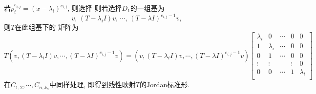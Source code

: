 若$p_i^{e_{i,j}} = (x-\lambda_i)^{e_{i,j}}$, 
则选择
则若选择$D_1$的一组基为
$$v,\, (T-\lambda_i I)v,\, \cdots,\, (T-\lambda I)^{e_{i,j}-1}v,$$
则$T$在此组基下的
矩阵为
\begin{equation}
T(v, (T-\lambda_i I)v, \cdots, (T-\lambda I)^{e_{i,j}-1}v)
= (v, (T-\lambda_i I)v, \cdots, (T-\lambda I)^{e_{i,j}-1}v)
\begin{bmatrix}
	\lambda_i& 0& \cdots &0 &0 \\
	1& \lambda_i& \cdots &0 &0\\
	0& 1& \cdots &0 & 0\\
	\vdots& \vdots& &\vdots& 0\\
	0& 0& \cdots& 1& \lambda_i\\
\end{bmatrix}
\end{equation}
在$C_{1,2}, \cdots, C_{n,k_n}$中同样处理,
即得到线性映射$T$的Jordan标准形.

